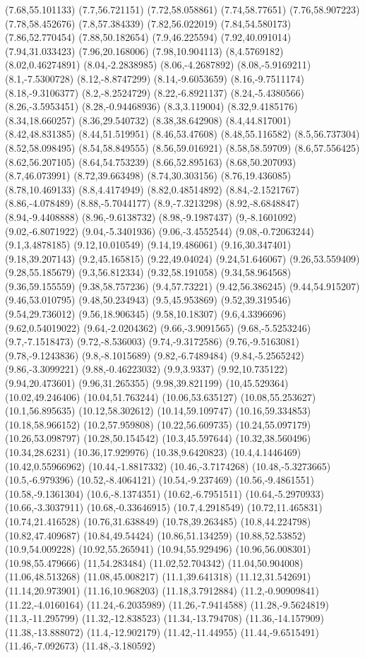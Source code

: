 (7.68,55.101133) (7.7,56.721151) (7.72,58.058861) (7.74,58.77651) (7.76,58.907223) (7.78,58.452676) (7.8,57.384339) (7.82,56.022019) (7.84,54.580173) (7.86,52.770454) (7.88,50.182654) (7.9,46.225594) (7.92,40.091014) (7.94,31.033423) (7.96,20.168006) (7.98,10.904113) (8,4.5769182) (8.02,0.46274891) (8.04,-2.2838985) (8.06,-4.2687892) (8.08,-5.9169211) (8.1,-7.5300728) (8.12,-8.8747299) (8.14,-9.6053659) (8.16,-9.7511174) (8.18,-9.3106377) (8.2,-8.2524729) (8.22,-6.8921137) (8.24,-5.4380566) (8.26,-3.5953451) (8.28,-0.94468936) (8.3,3.119004) (8.32,9.4185176) (8.34,18.660257) (8.36,29.540732) (8.38,38.642908) (8.4,44.817001) (8.42,48.831385) (8.44,51.519951) (8.46,53.47608) (8.48,55.116582) (8.5,56.737304) (8.52,58.098495) (8.54,58.849555) (8.56,59.016921) (8.58,58.59709) (8.6,57.556425) (8.62,56.207105) (8.64,54.753239) (8.66,52.895163) (8.68,50.207093) (8.7,46.073991) (8.72,39.663498) (8.74,30.303156) (8.76,19.436085) (8.78,10.469133) (8.8,4.4174949) (8.82,0.48514892) (8.84,-2.1521767) (8.86,-4.078489) (8.88,-5.7044177) (8.9,-7.3213298) (8.92,-8.6848847) (8.94,-9.4408888) (8.96,-9.6138732) (8.98,-9.1987437) (9,-8.1601092) (9.02,-6.8071922) (9.04,-5.3401936) (9.06,-3.4552544) (9.08,-0.72063244) (9.1,3.4878185) (9.12,10.010549) (9.14,19.486061) (9.16,30.347401) (9.18,39.207143) (9.2,45.165815) (9.22,49.04024) (9.24,51.646067) (9.26,53.559409) (9.28,55.185679) (9.3,56.812334) (9.32,58.191058) (9.34,58.964568) (9.36,59.155559) (9.38,58.757236) (9.4,57.73221) (9.42,56.386245) (9.44,54.915207) (9.46,53.010795) (9.48,50.234943) (9.5,45.953869) (9.52,39.319546) (9.54,29.736012) (9.56,18.906345) (9.58,10.18307) (9.6,4.3396696) (9.62,0.54019022) (9.64,-2.0204362) (9.66,-3.9091565) (9.68,-5.5253246) (9.7,-7.1518473) (9.72,-8.536003) (9.74,-9.3172586) (9.76,-9.5163081) (9.78,-9.1243836) (9.8,-8.1015689) (9.82,-6.7489484) (9.84,-5.2565242) (9.86,-3.3099221) (9.88,-0.46223032) (9.9,3.9337) (9.92,10.735122) (9.94,20.473601) (9.96,31.265355) (9.98,39.821199) (10,45.529364) (10.02,49.246406) (10.04,51.763244) (10.06,53.635127) (10.08,55.253627) (10.1,56.895635) (10.12,58.302612) (10.14,59.109747) (10.16,59.334853) (10.18,58.966152) (10.2,57.959808) (10.22,56.609735) (10.24,55.097179) (10.26,53.098797) (10.28,50.154542) (10.3,45.597644) (10.32,38.560496) (10.34,28.6231) (10.36,17.929976) (10.38,9.6420823) (10.4,4.1446469) (10.42,0.55966962) (10.44,-1.8817332) (10.46,-3.7174268) (10.48,-5.3273665) (10.5,-6.979396) (10.52,-8.4064121) (10.54,-9.237469) (10.56,-9.4861551) (10.58,-9.1361304) (10.6,-8.1374351) (10.62,-6.7951511) (10.64,-5.2970933) (10.66,-3.3037911) (10.68,-0.33646915) (10.7,4.2918549) (10.72,11.465831) (10.74,21.416528) (10.76,31.638849) (10.78,39.263485) (10.8,44.224798) (10.82,47.409687) (10.84,49.54424) (10.86,51.134259) (10.88,52.53852) (10.9,54.009228) (10.92,55.265941) (10.94,55.929496) (10.96,56.008301) (10.98,55.479666) (11,54.283484) (11.02,52.704342) (11.04,50.904008) (11.06,48.513268) (11.08,45.008217) (11.1,39.641318) (11.12,31.542691) (11.14,20.973901) (11.16,10.968203) (11.18,3.7912884) (11.2,-0.90909841) (11.22,-4.0160164) (11.24,-6.2035989) (11.26,-7.9414588) (11.28,-9.5624819) (11.3,-11.295799) (11.32,-12.838523) (11.34,-13.794708) (11.36,-14.157909) (11.38,-13.888072) (11.4,-12.902179) (11.42,-11.44955) (11.44,-9.6515491) (11.46,-7.092673) (11.48,-3.180592) 